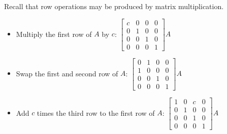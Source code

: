 \begin{remark}
Recall that row operations may be produced by matrix multiplication.
\begin{itemize}
\item Multiply the first row of \(A\) by \(c\): \(
  \begin{bmatrix}
  c & 0 & 0 & 0\\
  0 & 1 & 0 & 0 \\
  0 & 0 & 1 & 0 \\
  0 & 0 & 0 & 1
  \end{bmatrix}A
\)
\item Swap the first and second row of \(A\): \(
  \begin{bmatrix}
  0 & 1 & 0 & 0\\
  1 & 0 & 0 & 0\\
  0 & 0 & 1 & 0 \\
  0 & 0 & 0 & 1
  \end{bmatrix}A
\)
\item Add \(c\) times the third row to the first row of \(A\): \(
  \begin{bmatrix}
  1 & 0 & c & 0 \\
  0 & 1 & 0 & 0 \\
  0 & 0 & 1 & 0 \\
  0 & 0 & 0 & 1
  \end{bmatrix}A
\)
\end{itemize}
\end{remark}


